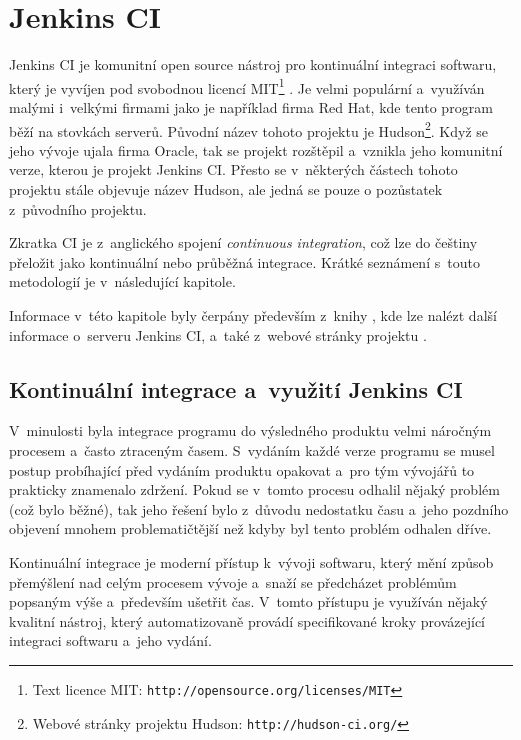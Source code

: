     \section {Jenkins CI} \label{jenkins}
        Jenkins CI je komunitní open source nástroj pro kontinuální integraci softwaru, který je vyvíjen pod svobodnou licencí
        MIT\footnote{Text licence MIT: \texttt{http://opensource.org/licenses/MIT}} \cite{jenkinsGovernance}.
        Je velmi populární a~využíván malými i~velkými firmami jako je například firma Red Hat, kde tento program běží na stovkách serverů.
        Původní název tohoto projektu je Hudson\footnote{Webové stránky projektu Hudson: \texttt{http://hudson-ci.org/}}. 
        Když se jeho vývoje ujala firma Oracle, tak se projekt
        rozštěpil a~vznikla jeho komunitní verze, kterou je projekt Jenkins CI. Přesto se v~některých částech tohoto projektu 
        stále objevuje název Hudson, ale jedná se pouze o pozůstatek z~původního projektu.

        Zkratka CI je z~anglického spojení \emph{continuous integration}, což lze do češtiny přeložit jako kontinuální nebo průběžná 
        integrace. Krátké seznámení s~touto metodologií je v~následující kapitole.

        Informace v~této kapitole byly čerpány především  z~knihy \cite{jenkinsBook}, kde lze nalézt další informace o~serveru Jenkins CI,
        a~také z~webové stránky projektu \cite{jenkinsWeb}.

        \subsection{Kontinuální integrace a~využití Jenkins CI}
            V~minulosti byla integrace programu do výsledného produktu velmi náročným procesem a~často ztraceným časem.
            S~vydáním každé verze programu se musel postup probíhající před vydáním produktu opakovat a~pro tým vývojářů
            to prakticky znamenalo zdržení. Pokud se v~tomto procesu odhalil nějaký problém (což bylo běžné),
            tak jeho řešení bylo z~důvodu nedostatku času a~jeho pozdního objevení mnohem problematičtější
            než kdyby byl tento problém odhalen dříve.

            Kontinuální integrace je moderní přístup k~vývoji softwaru, který mění způsob přemýšlení nad celým procesem vývoje
            a~snaží se předcházet problémům popsaným výše a~především ušetřit čas. V~tomto přístupu je využíván nějaký
            kvalitní nástroj, který automatizovaně provádí specifikované kroky provázející integraci softwaru a~jeho vydání.

